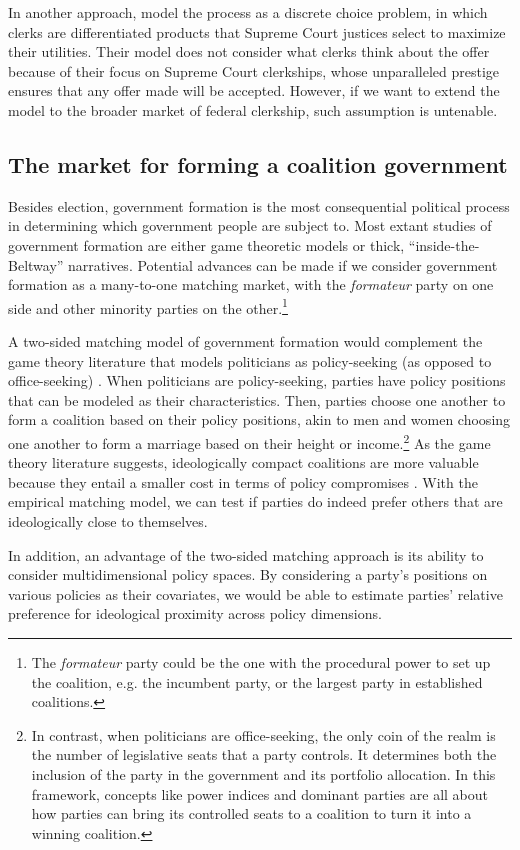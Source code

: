 In another approach, \citet{Rozema2016} model the process as a discrete choice
problem, in which clerks are differentiated products that Supreme Court justices
select to maximize their utilities. Their model does not consider what clerks
think about the offer because of their focus on Supreme Court clerkships, whose
unparalleled prestige ensures that any offer made will be accepted. However, if
we want to extend the model to the broader market of federal clerkship, such
assumption is untenable.

\subsection{The market for forming a coalition government}

Besides election, government formation is the most consequential political
process in determining which government people are subject to. Most extant
studies of government formation are either game theoretic models or thick,
``inside-the-Beltway'' narratives. Potential advances can be made if we consider
government formation as a many-to-one matching market, with the
\textit{formateur} party on one side and other minority parties on the
other.\footnote{The \textit{formateur} party could be the one with the
  procedural power to set up the coalition, e.g. the incumbent party, or the
  largest party in established coalitions.}

A two-sided matching model of government formation would complement the game
theory literature that models politicians as policy-seeking (as opposed to
office-seeking) \citep{Laver1998}. When politicians are policy-seeking, parties
have policy positions that can be modeled as their characteristics. Then,
parties choose one another to form a coalition based on their policy positions,
akin to men and women choosing one another to form a marriage based on their
height or income.\footnote{In contrast, when politicians are office-seeking, the
  only coin of the realm is the number of legislative seats that a party
  controls. It determines both the inclusion of the party in the government and
  its portfolio allocation. In this framework, concepts like power indices and
  dominant parties are all about how parties can bring its controlled seats to a
  coalition to turn it into a winning coalition.} As the game theory literature
suggests, ideologically compact coalitions are more valuable because they entail
a smaller cost in terms of policy compromises \citep{DeSwaan1973}. With the empirical
matching model, we can test if parties do indeed prefer others that are
ideologically close to themselves.

In addition, an advantage of the two-sided matching approach is its ability to
consider multidimensional policy spaces. By considering a party's positions on
various policies as their covariates, we would be able to estimate parties'
relative preference for ideological proximity across policy dimensions.
